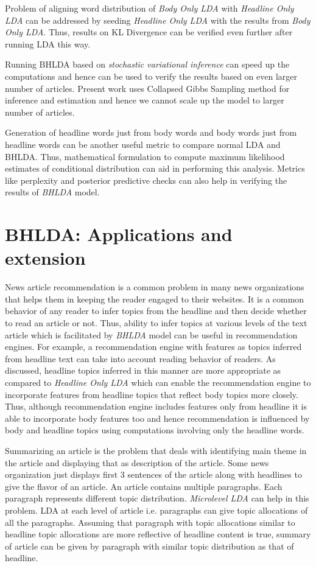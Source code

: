 \documentclass[a4paper]{article}
\begin{document}
Problem of aligning word distribution of \emph{Body Only LDA} with \emph{Headline Only LDA} can be addressed by seeding \emph{Headline Only LDA} with the results from \emph{Body Only LDA}. Thus, results on KL Divergence can be verified even further after running LDA this way. 

Running BHLDA based on \emph{stochastic variational inference} can speed up the computations and hence can be used to verify the results based on even larger number of articles. Present work uses Collapsed Gibbs Sampling method for inference and estimation and hence we cannot scale up the model to larger number of articles. 

Generation of headline words just from body words and body words just from headline words can be another useful metric to compare normal LDA and BHLDA. Thus, mathematical formulation to compute maximum likelihood estimates of conditional distribution can aid in performing this analysis. Metrics like perplexity and posterior predictive checks can also help in verifying the results of \emph{BHLDA} model. 

\section{BHLDA: Applications and extension} \label{application}
News article recommendation is a common problem in many news organizations that helps them in keeping the reader engaged to their websites. It is a common behavior of any reader to infer topics from the headline and then decide whether to read an article or not. Thus, ability to infer topics at various levels of the text article which is facilitated by \emph{BHLDA} model can be useful in recommendation engines. For example, a recommendation engine with features as topics inferred from headline text can take into account reading behavior of readers. As discussed, headline topics inferred in this manner are more appropriate as compared to \emph{Headline Only LDA} which can enable the recommendation engine to incorporate features from headline topics that reflect body topics more closely. Thus, although recommendation engine includes features only from headline it is able to incorporate body features too and hence recommendation is influenced by body and headline topics using computations involving only the headline words. 

Summarizing an article is the problem that deals with identifying main theme in the article and displaying that as description of the article. Some news organization just displays first 3 sentences of the article along with headlines to give the flavor of an article. An article contains multiple paragraphs. Each paragraph represents different topic distribution. \emph{Microlevel LDA} can help in this problem. LDA at each level of article i.e. paragraphs can give topic allocations of all the paragraphs. Assuming that paragraph with topic allocations similar to headline topic allocations are more reflective of headline content is true, summary of article can be given by paragraph with similar topic distribution as that of headline.
\end{document}
